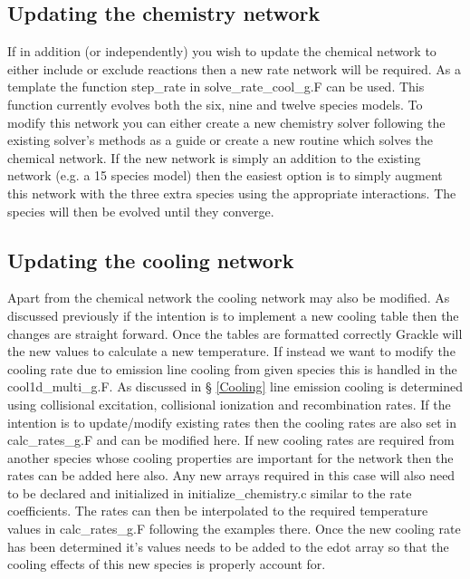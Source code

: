 \subsection{Updating the chemistry network}
If in addition (or independently) you wish to update the chemical network to either include or exclude
reactions then a new rate network will be required. As a template the function step\_rate in 
solve\_rate\_cool\_g.F can be used. This function currently evolves both the six, nine and twelve species 
models. To modify this network you can either create a new chemistry solver following the 
existing solver's methods as a guide or create a new routine which solves the chemical network. If the 
new network is simply an addition to the existing network (e.g. a 15 species model) then the easiest 
option is to simply augment this network with the three extra species using the appropriate 
interactions. The species will then be evolved until they converge.

\subsection{Updating the cooling network}
Apart from the chemical network the cooling network may also be modified. As discussed previously if the intention
is to implement a new cooling table then the changes are straight forward. Once the tables are formatted correctly
Grackle will the new values to calculate a new temperature. If instead we want to modify the cooling rate due 
to emission line cooling from given species this is handled in the cool1d\_multi\_g.F. As discussed in \S
\ref{Cooling} line emission cooling is determined using collisional excitation, collisional ionization and 
recombination rates. If the intention is to update/modify existing rates then the cooling rates are also set
in calc\_rates\_g.F and can be modified here. If new cooling rates are required from another species 
whose cooling properties are important for the network then the rates can be added here also. Any new arrays
required in this case will also need to be declared and initialized in initialize\_chemistry.c similar to the
rate coefficients. The rates can then be interpolated to the required temperature values in calc\_rates\_g.F 
following the examples there. Once the new cooling rate has been determined it's values needs to be added
to the edot array so that the cooling effects of this new species is properly account for.


